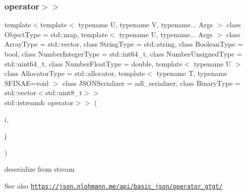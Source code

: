 \subsubsection{\texorpdfstring{operator$>$$>$}{operator>>}\hspace{0.1cm}{\footnotesize\ttfamily [2/2]}}
{\footnotesize\ttfamily template$<$template$<$ typename U, typename V, typename... Args $>$ class Object\+Type = std\+::map, template$<$ typename U, typename... Args $>$ class Array\+Type = std\+::vector, class String\+Type  = std\+::string, class Boolean\+Type  = bool, class Number\+Integer\+Type  = std\+::int64\+\_\+t, class Number\+Unsigned\+Type  = std\+::uint64\+\_\+t, class Number\+Float\+Type  = double, template$<$ typename U $>$ class Allocator\+Type = std\+::allocator, template$<$ typename T, typename S\+F\+I\+N\+A\+E=void $>$ class J\+S\+O\+N\+Serializer = adl\+\_\+serializer, class Binary\+Type  = std\+::vector$<$std\+::uint8\+\_\+t$>$$>$ \\
std\+::istream\& operator$>$$>$ (\begin{DoxyParamCaption}\item[{std\+::istream \&}]{i,  }\item[{\hyperlink{classnlohmann_1_1basic__json}{basic\+\_\+json}$<$ Object\+Type, Array\+Type, String\+Type, Boolean\+Type, Number\+Integer\+Type, Number\+Unsigned\+Type, Number\+Float\+Type, Allocator\+Type, J\+S\+O\+N\+Serializer, Binary\+Type $>$ \&}]{j }\end{DoxyParamCaption})\hspace{0.3cm}{\ttfamily [friend]}}



deserialize from stream 

\begin{DoxySeeAlso}{See also}
\href{https://json.nlohmann.me/api/basic_json/operator_gtgt/}{\tt https\+://json.\+nlohmann.\+me/api/basic\+\_\+json/operator\+\_\+gtgt/} 
\end{DoxySeeAlso}
\mbox{\label{classnlohmann_1_1basic__json_aee0ae36cbfb0336832ebc0374c3c7679}} 
